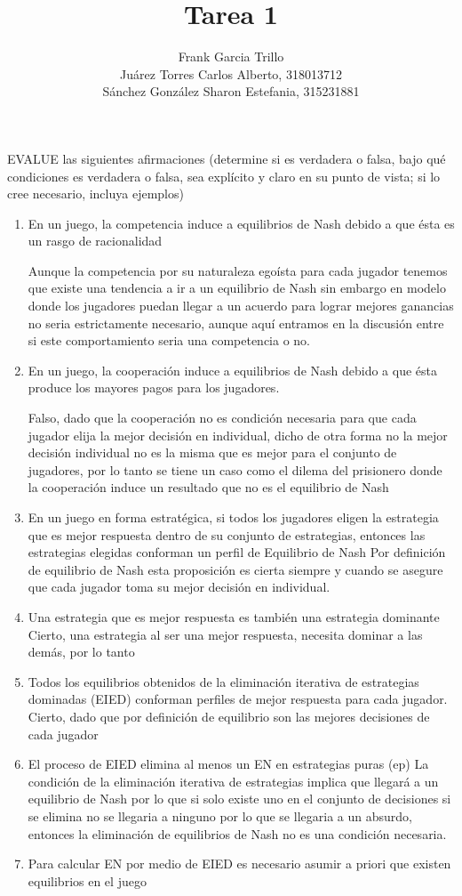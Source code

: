 \documentclass{homework}
\author{Frank Garcia Trillo\\
Juárez Torres Carlos Alberto,   318013712\\
Sánchez González Sharon Estefania, 315231881}
\title{Tarea 1}
\begin{document}
 \maketitle


\question EVALUE las siguientes afirmaciones (determine si es verdadera o falsa, bajo qué condiciones es verdadera o falsa, sea explícito y claro en su punto de vista; si lo cree necesario, incluya ejemplos)

\begin{enumerate}
        \item En un juego, la competencia induce a equilibrios de Nash debido a que ésta es un rasgo
de racionalidad
    
        Aunque la competencia por su naturaleza egoísta para cada jugador tenemos que existe una tendencia a ir a un equilibrio de Nash sin embargo en modelo donde los jugadores puedan llegar a un acuerdo para lograr mejores ganancias no seria estrictamente necesario, aunque aquí entramos en la discusión entre si este comportamiento seria una competencia o no.
    \item En un juego, la cooperación induce a equilibrios de Nash debido a que ésta produce los mayores pagos para los jugadores.
        
        Falso, dado que la cooperación no es condición necesaria para que cada jugador elija la mejor decisión en individual, dicho de otra forma no la mejor decisión individual no es la misma que es mejor para el conjunto de jugadores, por lo tanto se tiene un caso como el dilema del prisionero donde la cooperación induce un resultado que no es el equilibrio de Nash
    \item En un juego en forma estratégica, si todos los jugadores eligen la estrategia que es mejor respuesta dentro de su conjunto de estrategias, entonces las estrategias elegidas conforman un perfil de Equilibrio de Nash
        Por definición de equilibrio de Nash esta proposición es cierta siempre y cuando se asegure que cada jugador toma su mejor decisión en individual.
    \item Una estrategia que es mejor respuesta es también una estrategia dominante
        Cierto, una estrategia al ser una mejor respuesta, necesita dominar a las demás, por lo tanto 
    \item Todos los equilibrios obtenidos de la eliminación iterativa de estrategias dominadas (EIED) conforman perfiles de mejor respuesta para cada jugador.
        Cierto, dado que por definición de equilibrio son las mejores decisiones de cada jugador
    \item El proceso de EIED elimina al menos un EN en estrategias puras (ep)
        La condición de la eliminación iterativa de estrategias implica que llegará a un equilibrio de Nash por lo que si solo existe uno en el conjunto de decisiones si se elimina no se llegaria a ninguno por lo que se llegaria a un absurdo, entonces la eliminación de equilibrios de Nash no es una condición necesaria.
    \item Para calcular EN por medio de EIED es necesario asumir a priori que existen equilibrios en el juego
        

\end{enumerate}
\end{document}
